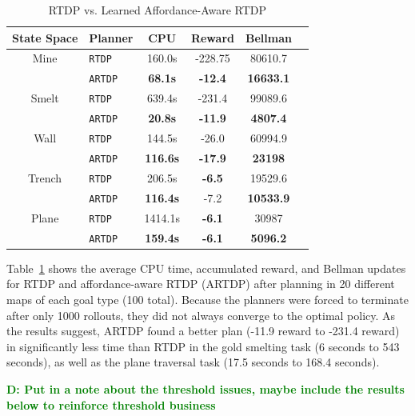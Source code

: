 \documentclass[conference]{IEEEtran}
\newcommand{\dnote}[1]{\textcolor{Green}{\textbf{D: #1}}}
\begin{document}
\begin{table}[H]
\centering
\caption{RTDP vs. Learned Affordance-Aware RTDP}
\begin{tabular}{ c l  || c c c c}
  State Space	&	Planner 		&	CPU	&	Reward 	& Bellman \\ \hline
  Mine 	& 	\texttt{RTDP}  		& 	160.0s	&	-228.75	&	80610.7		\\
  		& 	\texttt{ARTDP}  	& 	{\bf 68.1s}	&	{\bf -12.4}	&	{\bf 16633.1}	\\  \hline
  Smelt	&	\texttt{RTDP}  		& 	639.4s	&	-231.4	&	99089.6		\\
  		&	\texttt{ARTDP}  	& 	{\bf 20.8s}	&	{\bf -11.9}	&	{\bf 4807.4}	\\  \hline
  Wall	&	\texttt{RTDP}  		& 	144.5s	&	-26.0		&	60994.9		\\
  		&	\texttt{ARTDP}  	& 	{\bf 116.6s}&	{\bf -17.9}	&	{\bf 23198}	\\  \hline
  Trench	&	\texttt{RTDP}  		& 	206.5s	&	{\bf -6.5}	&	19529.6		\\
  		&	\texttt{ARTDP}  	& 	{\bf 116.4s}&	-7.2		&	{\bf 10533.9}	\\ \hline
Plane	&	\texttt{RTDP}  		& 	1414.1s	&	{\bf -6.1}	&	30987		\\
  		&	\texttt{ARTDP}  	& 	{\bf 159.4s}&	{\bf -6.1}	&	{\bf 5096.2}	\\ 
\end{tabular}
\label{table:minecraft_results}
\end{table}

Table~\ref{table:minecraft_results} shows the average CPU time, accumulated reward, and Bellman updates 
for RTDP and affordance-aware RTDP (ARTDP) after planning in 20 different maps of each goal type (100 total). Because the planners were forced to terminate after only 1000 rollouts, they did not always converge to the optimal policy. 
As the results suggest, ARTDP found a better plan (-11.9 reward to -231.4 reward) in significantly less time than 
RTDP in the gold smelting task (6 seconds to 543 seconds), as well as the plane traversal task (17.5 seconds to 168.4 seconds).

\dnote{Put in a note about the threshold issues, maybe include the results below to reinforce threshold business}

\end{document}

